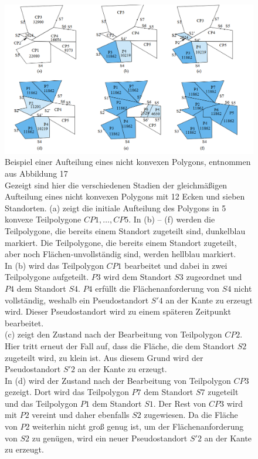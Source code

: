 \documentclass[ngerman]{seminarbeitrag}
\begin{document}
\begin{figure}[hb]
\begin{center}
\includegraphics[width=1\textwidth]{./Abbildungen/5.png}   
\end{center}
\caption{\small Beispiel einer Aufteilung eines nicht konvexen Polygons, entnommen aus \cite{Hert.1998} Abbildung 17\\
Gezeigt sind hier die verschiedenen Stadien der gleichmäßigen Aufteilung eines nicht konvexen Polygons mit 12 Ecken und sieben Standorten. (a) zeigt die initiale Aufteilung des Polygons in 5 konvexe Teilpolygone $CP1, …,CP5$. In (b) – (f) werden die Teilpolygone, die bereits einem Standort zugeteilt sind, dunkelblau markiert. Die Teilpolygone, die bereits einem Standort zugeteilt, aber noch Flächen-unvollständig sind, werden hellblau markiert.\\
In (b) wird das Teilpolygon $CP1$ bearbeitet und dabei in zwei Teilpolygone aufgeteilt. $P3$ wird dem Standort $S3$ zugeordnet und $P4$ dem Standort $S4$. $P4$ erfüllt die Flächenanforderung von $S4$ nicht vollständig, weshalb ein Pseudostandort $S'4$ an der Kante zu erzeugt wird. Dieser Pseudostandort wird zu einem späteren Zeitpunkt bearbeitet.\\
 (c) zeigt den Zustand nach der Bearbeitung von Teilpolygon $CP2$. Hier tritt erneut der Fall auf, dass die Fläche, die dem Standort $S2$ zugeteilt wird, zu klein ist. Aus diesem Grund wird der Pseudostandort $S'2$ an der Kante zu erzeugt.\\
In (d) wird der Zustand nach der Bearbeitung von Teilpolygon $CP3$ gezeigt. Dort wird das Teilpolygon $P7$ dem Standort $S7$ zugeteilt und das Teilpolygon $P1$ dem Standort $S1$. Der Rest von $CP3$ wird mit $P2$ vereint und daher ebenfalls $S2$ zugewiesen. Da die Fläche von $P2$ weiterhin nicht groß genug ist, um der Flächenanforderung von $S2$ zu genügen, wird ein neuer Pseudostandort $S'2$ an der Kante zu erzeugt.\\
}
\end{figure}
\end{document}
